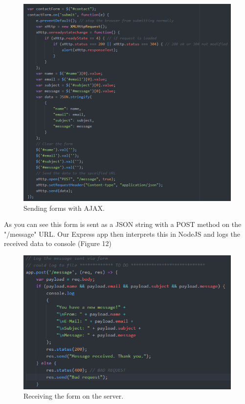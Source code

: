 \documentclass[12pt]{article} %
\begin{document}
	\begin{figure}[H] %
	\includegraphics[width=1\linewidth]{images/AJAX}
	\caption{Sending forms with AJAX.}
	\label{AJAX}
	\end{figure}

	\noindent As you can see this form is sent as a JSON string with a POST method on the "/message" URL. Our Express app then interprets this in NodeJS and logs the received data to console (Figure 12)

	\begin{figure}[H] %
	\includegraphics[width=1\linewidth]{images/AJAXserver}
	\caption{Receiving the form on the server.}
	\label{AJAXserver}
	\end{figure}
\end{document}
